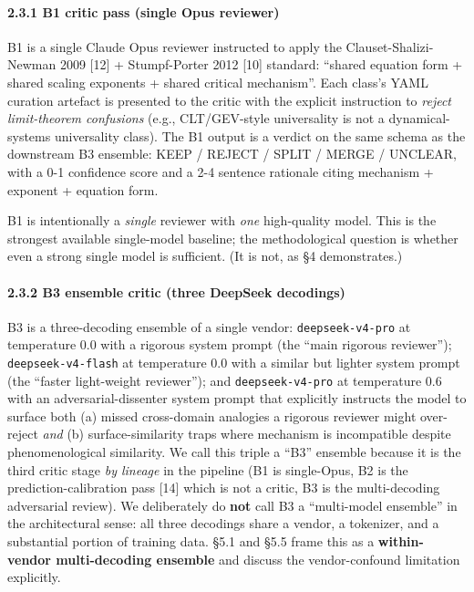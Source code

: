\documentclass[
  letterpaper,
  11pt]{article}
\begin{document}
\paragraph{2.3.1 B1 critic pass (single Opus
reviewer)}\label{b1-critic-pass-single-opus-reviewer}

B1 is a single Claude Opus reviewer instructed to apply the
Clauset-Shalizi-Newman 2009 {[}12{]} + Stumpf-Porter 2012 {[}10{]}
standard: ``shared equation form + shared scaling exponents + shared
critical mechanism''. Each class's YAML curation artefact is presented
to the critic with the explicit instruction to \emph{reject
limit-theorem confusions} (e.g., CLT/GEV-style universality is not a
dynamical-systems universality class). The B1 output is a verdict on the
same schema as the downstream B3 ensemble: KEEP / REJECT / SPLIT / MERGE
/ UNCLEAR, with a 0-1 confidence score and a 2-4 sentence rationale
citing mechanism + exponent + equation form.

B1 is intentionally a \emph{single} reviewer with \emph{one}
high-quality model. This is the strongest available single-model
baseline; the methodological question is whether even a strong single
model is sufficient. (It is not, as §4 demonstrates.)

\paragraph{2.3.2 B3 ensemble critic (three DeepSeek
decodings)}\label{b3-ensemble-critic-three-deepseek-decodings}

B3 is a three-decoding ensemble of a single vendor:
\texttt{deepseek-v4-pro} at temperature 0.0 with a rigorous system
prompt (the ``main rigorous reviewer''); \texttt{deepseek-v4-flash} at
temperature 0.0 with a similar but lighter system prompt (the ``faster
light-weight reviewer''); and \texttt{deepseek-v4-pro} at temperature
0.6 with an adversarial-dissenter system prompt that explicitly
instructs the model to surface both (a) missed cross-domain analogies a
rigorous reviewer might over-reject \emph{and} (b) surface-similarity
traps where mechanism is incompatible despite phenomenological
similarity. We call this triple a ``B3'' ensemble because it is the
third critic stage \emph{by lineage} in the pipeline (B1 is single-Opus,
B2 is the prediction-calibration pass {[}14{]} which is not a critic, B3
is the multi-decoding adversarial review). We deliberately do
\textbf{not} call B3 a ``multi-model ensemble'' in the architectural
sense: all three decodings share a vendor, a tokenizer, and a
substantial portion of training data. §5.1 and §5.5 frame this as a
\textbf{within-vendor multi-decoding ensemble} and discuss the
vendor-confound limitation explicitly.
\end{document}
